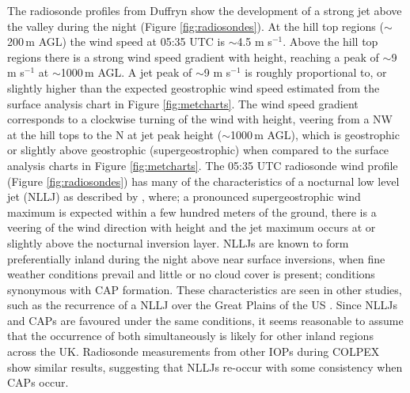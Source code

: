 \documentclass[times]{qjrms4}
\begin{document}
The radiosonde profiles from Duffryn show the development of a strong jet above the valley during the night (Figure \ref{fig:radiosondes}). At the hill top regions ($\sim$200$\,\mbox{m}$ AGL) the wind speed at 05:35 UTC is $\sim$4.5 m s$^{-1}$. Above the hill top regions there is a strong wind speed gradient with height, reaching a peak of $\sim$9 m s$^{-1}$ at $\sim$1000$\,\mbox{m}$ AGL. A jet peak of $\sim$9 m s$^{-1}$ is roughly proportional to, or slightly higher than the expected geostrophic wind speed estimated from the surface analysis chart in Figure \ref{fig:metcharts}. The wind speed gradient corresponds to a clockwise turning of the wind with height, veering from a NW at the hill tops to the N at jet peak height ($\sim$1000$\,\mbox{m}$ AGL), which is geostrophic or slightly above geostrophic (supergeostrophic) when compared to the surface analysis charts in Figure \ref{fig:metcharts}. The 05:35 UTC radiosonde wind profile (Figure \ref{fig:radiosondes}) has many of the characteristics of a nocturnal low level jet (NLLJ) as described by \citet{thorpe1977nocturnal}, where; a pronounced supergeostrophic wind maximum is expected within a few hundred meters of the ground, there is a veering of the wind direction with height and the jet maximum occurs at or slightly above the nocturnal inversion layer. NLLJs are known to form preferentially inland during the night above near surface inversions, when fine weather conditions prevail and little or no cloud cover is present; conditions synonymous with CAP formation. These characteristics are seen in other studies, such as the recurrence of a NLLJ over the Great Plains of the US \citep[p 168]{whiteman2000mountain}. Since NLLJs and CAPs are favoured under the same conditions, it seems reasonable to assume that the occurrence of both simultaneously is likely for other inland regions across the UK. Radiosonde measurements from other IOPs during COLPEX show similar results, suggesting that NLLJs re-occur with some consistency when CAPs occur.
\end{document}
